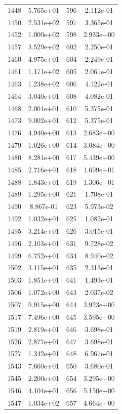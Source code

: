 \documentclass[12pt]{article}
\begin{document}
\begin{longtable}{@{}cccc@{}}
1448 & 5.765e+01 & 596 & 2.112e-01 \\
1450 & 2.531e+02 & 597 & 3.365e-01 \\
1452 & 1.000e+02 & 598 & 2.933e+00 \\
1457 & 3.529e+02 & 602 & 2.250e-01 \\
1460 & 4.975e+01 & 604 & 2.249e-01 \\
1461 & 1.171e+02 & 605 & 2.061e-01 \\
1463 & 1.238e+02 & 606 & 4.122e-01 \\
1464 & 3.040e+01 & 608 & 4.082e-01 \\
1468 & 2.001e+01 & 610 & 5.375e-01 \\
1473 & 9.002e+01 & 612 & 5.375e-01 \\
1476 & 4.940e+00 & 613 & 2.683e+00 \\
1479 & 1.026e+00 & 614 & 3.084e+00 \\
1480 & 8.281e+00 & 617 & 5.439e+00 \\
1485 & 2.716e+01 & 618 & 1.699e+01 \\
1488 & 1.843e+01 & 619 & 1.306e+01 \\
1489 & 1.295e+00 & 621 & 1.708e-01 \\
1490 & 8.867e-01 & 623 & 5.973e-02 \\
1492 & 1.032e+01 & 625 & 1.082e-01 \\
1495 & 3.214e+01 & 626 & 3.015e-01 \\
1496 & 2.103e+01 & 631 & 9.728e-02 \\
1499 & 6.752e+01 & 634 & 8.940e-02 \\
1502 & 3.115e+01 & 635 & 2.313e-01 \\
1503 & 1.851e+01 & 641 & 1.493e-01 \\
1506 & 1.072e+00 & 643 & 2.037e-02 \\
1507 & 9.915e+00 & 644 & 3.923e+00 \\
1517 & 7.496e+00 & 645 & 3.595e+00 \\
1519 & 2.819e+01 & 646 & 3.698e-01 \\
1526 & 2.877e+01 & 647 & 3.698e-01 \\
1527 & 1.342e+01 & 648 & 6.967e-01 \\
1543 & 7.660e+01 & 650 & 3.680e-01 \\
1545 & 2.200e+01 & 654 & 3.295e+00 \\
1546 & 4.104e+01 & 656 & 5.150e+00 \\
1547 & 1.034e+02 & 657 & 4.664e+00 \\

\bottomrule
\end{longtable}
\end{document}
